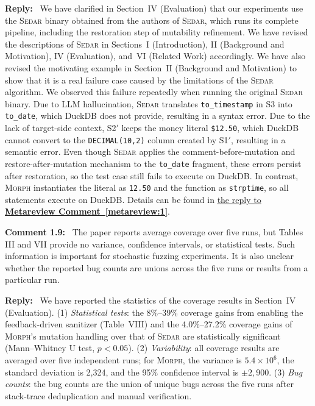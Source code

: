 \documentclass[12pt,letterpaper]{article}
\newcommand{\morph}{\textsc{Morph}}
\newcommand{\sedar}{\textsc{Sedar}}
\newcommand{\tool}{\morph}
\newcommand{\reviewstart}{\par\addvspace{0.85\baselineskip}\Needspace{4\baselineskip}\noindent}
\newcounter{commentanchor}
\newcommand{\reviewcomment}[1]{\reviewstart\renewcommand{\thecommentanchor}{#1}\refstepcounter{commentanchor}\label{comment:#1}\textbf{Comment #1:}\ }
\newcommand{\metareviewref}[1]{\hyperref[metareview:#1]{\uline{the reply to \textbf{Metareview Comment~\ref*{metareview:#1}}}}}
\newcommand{\reply}{\par\nobreak\noindent\textbf{Reply:}\ }
\begin{document}
\reply
We have clarified in Section~IV (Evaluation) that our experiments use the \sedar{} binary obtained from the authors of \sedar{}, which runs its complete pipeline, including the restoration step of mutability refinement. We have revised the descriptions of \sedar{} in Sections~I (Introduction), II (Background and Motivation), IV (Evaluation), and~VI (Related Work) accordingly. We have also revised the motivating example in Section~II (Background and Motivation) to show that it is a real failure case caused by the limitations of the \sedar{} algorithm. We observed this failure repeatedly when running the original \sedar{} binary. Due to LLM hallucination, \sedar{} translates \texttt{to\_timestamp} in S3 into \texttt{to\_date}, which DuckDB does not provide, resulting in a syntax error. Due to the lack of target-side context, S2$'$ keeps the money literal \texttt{\textquotesingle{}\$12.50\textquotesingle{}}, which DuckDB cannot convert to the \texttt{DECIMAL(10,2)} column created by S1$'$, resulting in a semantic error. Even though \sedar{} applies the comment-before-mutation and restore-after-mutation mechanism to the \texttt{to\_date} fragment, these errors persist after restoration, so the test case still fails to execute on DuckDB. In contrast, \tool{} instantiates the literal as \texttt{12.50} and the function as \texttt{strptime}, so all statements execute on DuckDB. Details can be found in \metareviewref{1}.

\reviewcomment{1.9} The paper reports average coverage over five runs, but Tables III and VII provide no variance, confidence intervals, or statistical tests. Such information is important for stochastic fuzzing experiments. It is also unclear whether the reported bug counts are unions across the five runs or results from a particular run.

\reply
We have reported the statistics of the coverage results in Section~IV (Evaluation). (1) \textit{Statistical tests}: the 8\%--39\% coverage gains from enabling the feedback-driven sanitizer (Table~VIII) and the 4.0\%--27.2\% coverage gains of \tool{}'s mutation handling over that of \sedar{} are statistically significant (Mann--Whitney U test, $p<0.05$). (2) \textit{Variability}: all coverage results are averaged over five independent runs; for \tool{}, the variance is $5.4\times10^{6}$, the standard deviation is 2,324, and the 95\% confidence interval is $\pm2,900$. (3) \textit{Bug counts}: the bug counts are the union of unique bugs across the five runs after stack-trace deduplication and manual verification.
\end{document}
